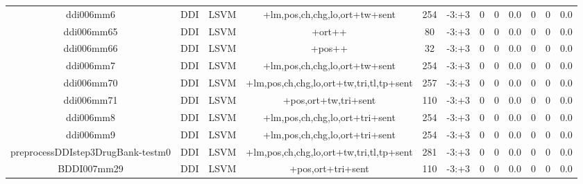 \documentclass[a4paper]{article}
\begin{document}
\begin{landscape}
\begin{center}
\begin{tabular}{ |c|c|c|c|c|c|c|c|c|c|c|c|}
 
 	
 	\small{ ddi006mm6 } & \small{ DDI} & \small{  LSVM }  & +lm,pos,ch,chg,lo,ort+tw+sent  &  254 &  \small{  -3:+3 }  &  0 & 0 & 0.0  &  0 & 0 & 0.0 \\
 	

 
 	
 	\small{ ddi006mm65 } & \small{ DDI} & \small{  LSVM }  & +ort++  &  80 &  \small{  -3:+3 }  &  0 & 0 & 0.0  &  0 & 0 & 0.0 \\
 	

 
 	
 	\small{ ddi006mm66 } & \small{ DDI} & \small{  LSVM }  & +pos++  &  32 &  \small{  -3:+3 }  &  0 & 0 & 0.0  &  0 & 0 & 0.0 \\
 	

 
 	
 	\small{ ddi006mm7 } & \small{ DDI} & \small{  LSVM }  & +lm,pos,ch,chg,lo,ort+tw+sent  &  254 &  \small{  -3:+3 }  &  0 & 0 & 0.0  &  0 & 0 & 0.0 \\
 	

 
 	
 	\small{ ddi006mm70 } & \small{ DDI} & \small{  LSVM }  & +lm,pos,ch,chg,lo,ort+tw,tri,tl,tp+sent  &  257 &  \small{  -3:+3 }  &  0 & 0 & 0.0  &  0 & 0 & 0.0 \\
 	

 
 	
 	\small{ ddi006mm71 } & \small{ DDI} & \small{  LSVM }  & +pos,ort+tw,tri+sent  &  110 &  \small{  -3:+3 }  &  0 & 0 & 0.0  &  0 & 0 & 0.0 \\
 	

 
 	
 	\small{ ddi006mm8 } & \small{ DDI} & \small{  LSVM }  & +lm,pos,ch,chg,lo,ort+tri+sent  &  254 &  \small{  -3:+3 }  &  0 & 0 & 0.0  &  0 & 0 & 0.0 \\
 	

 
 	
 	\small{ ddi006mm9 } & \small{ DDI} & \small{  LSVM }  & +lm,pos,ch,chg,lo,ort+tri+sent  &  254 &  \small{  -3:+3 }  &  0 & 0 & 0.0  &  0 & 0 & 0.0 \\
 	

 
 	
 	\small{ preprocessDDIstep3DrugBank-testm0 } & \small{ DDI} & \small{  LSVM }  & +lm,pos,ch,chg,lo,ort+tw,tri,tl,tp+sent  &  281 &  \small{  -3:+3 }  &  0 & 0 & 0.0  &  0 & 0 & 0.0 \\
 	

 
 	
 	\small{ BDDI007mm29 } & \small{ DDI} & \small{  LSVM }  & +pos,ort+tri+sent  &  110 &  \small{  -3:+3 }  &  0 & 0 & 0.0  &  0 & 0 & 0.0 \\
 	


\end{tabular}
\end{center}
\end{landscape}
\end{document}
